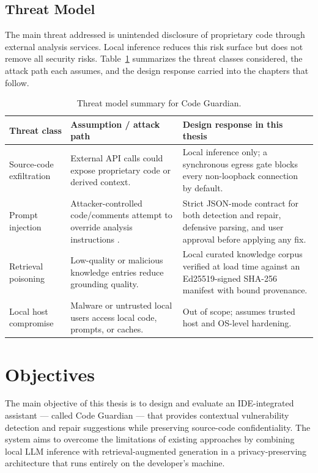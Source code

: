 \subsection{Threat Model}
\label{sec:intro-threat-model}

The main threat addressed is unintended disclosure of proprietary code through external analysis services. Local inference reduces this risk surface but does not remove all security risks. Table~\ref{tab:intro-threat-model} summarizes the threat classes considered, the attack path each assumes, and the design response carried into the chapters that follow.

\begin{table}[H]
  \centering
  \caption{Threat model summary for Code Guardian.}
  \label{tab:intro-threat-model}
  \footnotesize
  \renewcommand{\arraystretch}{1.15}
  \begin{tabularx}{\textwidth}{p{}p{}X}
    \toprule
    Threat class & Assumption / attack path & Design response in this thesis \\
    \midrule
    Source-code exfiltration & External API calls could expose proprietary code or derived context. & Local inference only; a synchronous egress gate blocks every non-loopback connection by default. \\
    Prompt injection & Attacker-controlled code/comments attempt to override analysis instructions \cite{owaspLLMTop10_2023}. & Strict JSON-mode contract for both detection and repair, defensive parsing, and user approval before applying any fix. \\
    Retrieval poisoning & Low-quality or malicious knowledge entries reduce grounding quality. & Local curated knowledge corpus verified at load time against an Ed25519-signed SHA-256 manifest with bound provenance. \\
    Local host compromise & Malware or untrusted local users access local code, prompts, or caches. & Out of scope; assumes trusted host and OS-level hardening. \\
    \bottomrule
 \end{tabularx}
\end{table}

\section{Objectives}
\label{sec:intro-objectives}

The main objective of this thesis is to design and evaluate an IDE-integrated assistant --- called Code Guardian --- that provides contextual vulnerability detection and repair suggestions while preserving source-code confidentiality. The system aims to overcome the limitations of existing approaches by combining local LLM inference with retrieval-augmented generation in a privacy-preserving architecture that runs entirely on the developer's machine.

